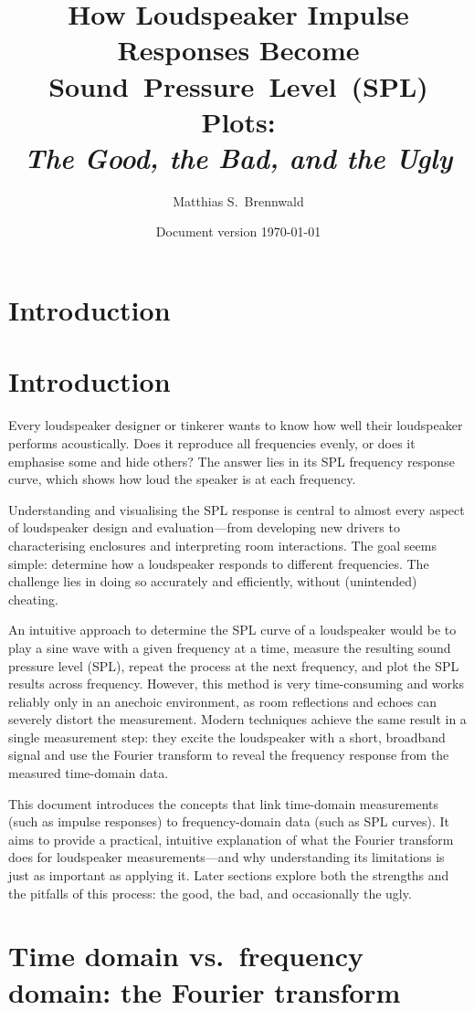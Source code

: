 \documentclass[12pt,a4paper]{article}
\title{How Loudspeaker Impulse Responses Become Sound~Pressure~Level~(SPL) Plots:\\[0.7em]\textit{The Good, the Bad, and the Ugly}}
\author{Matthias S.~Brennwald}
\date{Document version \today}
\begin{document}
\maketitle

\section{Introduction}
\section*{Introduction}

Every loudspeaker designer or tinkerer wants to know how well their loudspeaker performs acoustically. Does it reproduce all frequencies evenly, or does it emphasise some and hide others? The answer lies in its SPL frequency response curve, which shows how loud the speaker is at each frequency.

Understanding and visualising the SPL response is central to almost every aspect of loudspeaker design and evaluation—from developing new drivers to characterising enclosures and interpreting room interactions. The goal seems simple: determine how a loudspeaker responds to different frequencies. The challenge lies in doing so accurately and efficiently, without (unintended) cheating.

An intuitive approach to determine the SPL curve of a loudspeaker would be to play a sine wave with a given frequency at a time, measure the resulting sound pressure level (SPL), repeat the process at the next frequency, and plot the SPL results across frequency. However, this method is very time-consuming and works reliably only in an anechoic environment, as room reflections and echoes can severely distort the measurement. Modern techniques achieve the same result in a single measurement step: they excite the loudspeaker with a short, broadband signal and use the Fourier transform to reveal the frequency response from the measured time-domain data.

This document introduces the concepts that link time-domain measurements (such as impulse responses) to frequency-domain data (such as SPL curves). It aims to provide a practical, intuitive explanation of what the Fourier transform does for loudspeaker measurements—and why understanding its limitations is just as important as applying it. Later sections explore both the strengths and the pitfalls of this process: the good, the bad, and occasionally the ugly.


\section{Time domain vs.\ frequency domain: the Fourier transform}
\end{document}
